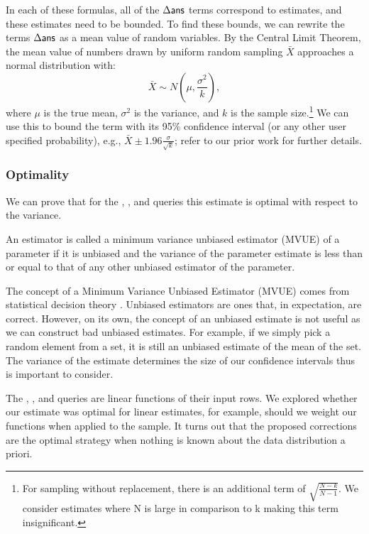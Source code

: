In each of these formulas, all of the $\Delta\textsf{ans}$ terms correspond to estimates, and these estimates need to be bounded.
To find these bounds, we can rewrite the terms $\Delta\textsf{ans}$ as a mean value of random variables. 
By the Central Limit Theorem, the mean value of numbers drawn by uniform random sampling $\bar{X}$ approaches a normal distribution with:
\[
\bar{X} \sim N(\mu,\frac{\sigma^2}{k}),
\]
where $\mu$ is the true mean, $\sigma^2$ is the variance, and $k$ is the sample size.\footnote{\scriptsize For sampling without replacement, there is an additional term of $\sqrt{\frac{N-k}{N-1}}$. We consider estimates where N is large in comparison to k making this term insignificant.}
We can use this to bound the term with its 95\% confidence interval (or any other user specified probability), e.g., $\bar{X} \pm 1.96 \frac{\sigma}{\sqrt{k}}$; refer to our prior work \cite{wang1999sample} for further details.

\subsubsection{Optimality}
We can prove that for the \sumfunc, \countfunc, and \avgfunc queries this estimate is optimal with respect to the variance.
\begin{proposition}
An estimator is called a minimum variance unbiased estimator (MVUE) of a parameter if it is unbiased and the variance of the parameter estimate is less than or equal to that of any other unbiased estimator of the parameter.
\end{proposition}
The concept of a Minimum Variance Unbiased Estimator (MVUE) comes from statistical decision theory \cite{cox1979theoretical}.
Unbiased estimators are ones that, in expectation, are correct.
However, on its own, the concept of an unbiased estimate is not useful as we can construct bad unbiased estimates.
For example, if we simply pick a random element from a set, it is still an unbiased estimate of the mean of the set.
The variance of the estimate determines the size of our confidence intervals thus is important to consider.

The \sumfunc, \countfunc, and \avgfunc queries are linear functions of their input rows.
We explored whether our estimate was optimal for linear estimates, for example, should we weight our functions when applied to the sample.
It turns out that the proposed corrections are the optimal strategy when nothing is known about the data distribution a priori.

